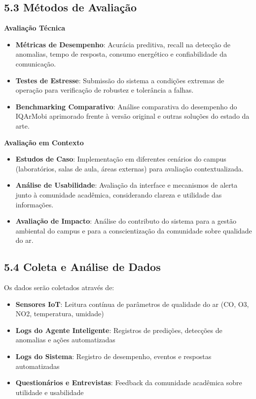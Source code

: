 \documentclass[12pt, a4paper]{article}
\begin{document}
\subsection*{5.3 Métodos de Avaliação}

\textbf{Avaliação Técnica}
\begin{itemize}
    \item \textbf{Métricas de Desempenho}: Acurácia preditiva, recall na detecção de anomalias, tempo de resposta, 
    consumo energético e confiabilidade da comunicação.
    \item \textbf{Testes de Estresse}: Submissão do sistema a condições extremas de operação para 
    verificação de robustez e tolerância a falhas.
    \item \textbf{Benchmarking Comparativo}: Análise comparativa do desempenho do IQArMobi aprimorado frente 
    à versão original e outras soluções do estado da arte.
\end{itemize}

\textbf{Avaliação em Contexto}
\begin{itemize}
    \item \textbf{Estudos de Caso}: Implementação em diferentes cenários do campus 
    (laboratórios, salas de aula, áreas externas) para avaliação contextualizada.
    \item \textbf{Análise de Usabilidade}: Avaliação da interface e mecanismos de alerta junto 
    à comunidade acadêmica, considerando clareza e utilidade das informações.
    \item \textbf{Avaliação de Impacto}: Análise do contributo do sistema para 
    a gestão ambiental do campus e para a conscientização da comunidade sobre qualidade do ar.
\end{itemize}

\subsection*{5.4 Coleta e Análise de Dados}

Os dados serão coletados através de:
\begin{itemize}
    \item \textbf{Sensores IoT}: Leitura contínua de parâmetros de qualidade do ar (CO, O3, NO2, temperatura, umidade)
    \item \textbf{Logs do Agente Inteligente}: Registros de predições, detecções de anomalias e ações automatizadas
    \item \textbf{Logs do Sistema}: Registro de desempenho, eventos e respostas automatizadas
    \item \textbf{Questionários e Entrevistas}: Feedback da comunidade acadêmica sobre utilidade e usabilidade
\end{itemize}
\end{document}
